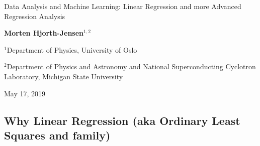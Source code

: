\documentclass[%
oneside,                 %
final,                   %
10pt]{article}
\begin{document}

\newcommand{\exercisesection}[1]{\subsection*{#1}}






\thispagestyle{empty}

\begin{center}
{\LARGE\bf
\begin{spacing}{1.25}
Data Analysis and Machine Learning: Linear Regression and more Advanced Regression Analysis
\end{spacing}
}
\end{center}


\begin{center}
{\bf Morten Hjorth-Jensen${}^{1, 2}$} \\ [0mm]
\end{center}

\begin{center}
\centerline{{\small ${}^1$Department of Physics, University of Oslo}}
\centerline{{\small ${}^2$Department of Physics and Astronomy and National Superconducting Cyclotron Laboratory, Michigan State University}}
\end{center}
    

\begin{center}
May 17, 2019
\end{center}

\vspace{1cm}


\subsection*{Why Linear Regression (aka Ordinary Least Squares and family)}
\end{document}

